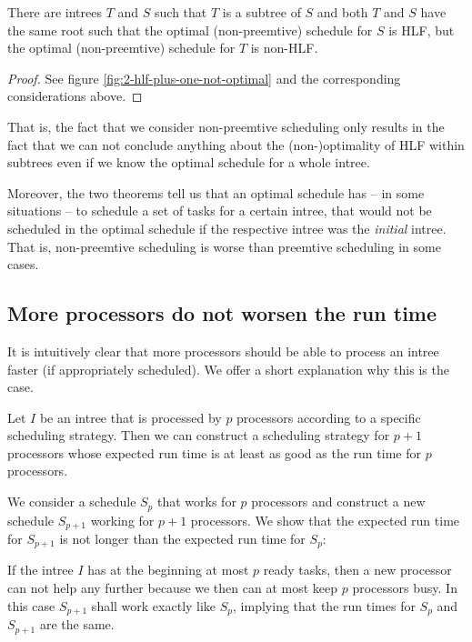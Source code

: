 \begin{theorem}
  There are intrees $T$ and $S$ such that $T$ is a subtree of $S$ and both $T$ and $S$ have the same root such that the optimal (non-preemtive) schedule for $S$ is HLF, but the optimal (non-preemtive) schedule for $T$ is non-HLF.
\end{theorem}

\begin{proof}
  See figure \ref{fig:2-hlf-plus-one-not-optimal} and the corresponding considerations above.
\end{proof}

That is, the fact that we consider non-preemtive scheduling only results in the fact that we can not conclude anything about the (non-)optimality of HLF within subtrees even if we know the optimal schedule for a whole intree.

Moreover, the two theorems tell us that an optimal schedule has -- in some situations -- to schedule a set of tasks for a certain intree, that would not be scheduled in the optimal schedule if the respective intree was the \emph{initial} intree. That is, non-preemtive scheduling is worse than preemtive scheduling in some cases.

\subsection{More processors do not worsen the run time}
\label{sec:properties-more-processors-are-better}

It is intuitively clear that more processors should be able to process an intree faster (if appropriately scheduled). We offer a short explanation why this is the case.

\begin{theorem}
  Let $I$ be an intree that is processed by $p$ processors according to a specific scheduling strategy. Then we can construct a scheduling strategy for $p+1$ processors whose expected run time is at least as good as the run time for $p$ processors.
\end{theorem}

  We consider a schedule $S_p$ that works for $p$ processors and construct a new schedule $S_{p+1}$ working for $p+1$ processors. We show that the expected run time for $S_{p+1}$ is not longer than the expected run time for $S_p$:

  If the intree $I$ has at the beginning at most $p$ ready tasks, then a new processor can not help any further because we then can at most keep $p$ processors busy. In this case $S_{p+1}$ shall work exactly like $S_p$, implying that the run times for $S_p$ and $S_{p+1}$ are the same.

